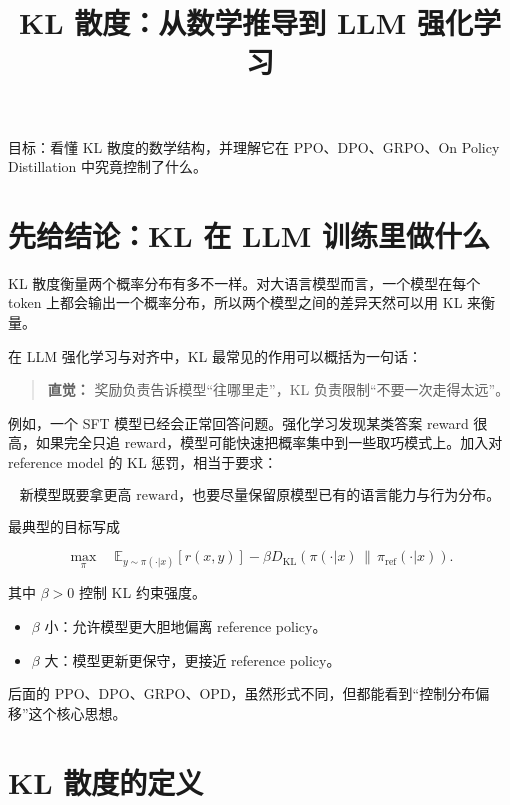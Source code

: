 \documentclass[11pt,a4paper]{ctexart}
\title{\textbf{KL 散度：从数学推导到 LLM 强化学习}}
\author{}
\date{}
\newcommand{\KL}[2]{D_{\mathrm{KL}}\!\left(#1\,\middle\|\,#2\right)}
\newcommand{\E}{\mathbb{E}}
\newcommand{\piref}{\pi_{\mathrm{ref}}}
\newenvironment{intuition}
{\begin{quote}\small\textbf{直觉：}}
{\end{quote}}
\begin{document}
\maketitle
\vspace{-2em}

\begin{center}
\small
目标：看懂 KL 散度的数学结构，并理解它在 PPO、DPO、GRPO、On Policy Distillation 中究竟控制了什么。
\end{center}

\tableofcontents

\section{先给结论：KL 在 LLM 训练里做什么}

KL 散度衡量两个概率分布有多不一样。对大语言模型而言，一个模型在每个 token 上都会输出一个概率分布，所以两个模型之间的差异天然可以用 KL 来衡量。

在 LLM 强化学习与对齐中，KL 最常见的作用可以概括为一句话：

\begin{intuition}
奖励负责告诉模型“往哪里走”，KL 负责限制“不要一次走得太远”。
\end{intuition}

例如，一个 SFT 模型已经会正常回答问题。强化学习发现某类答案 reward 很高，如果完全只追 reward，模型可能快速把概率集中到一些取巧模式上。加入对 reference model 的 KL 惩罚，相当于要求：

\[
\text{新模型既要拿更高 reward，也要尽量保留原模型已有的语言能力与行为分布。}
\]

最典型的目标写成

\begin{equation}
\max_{\pi}
\quad
\E_{y\sim\pi(\cdot|x)}[r(x,y)]
-
\beta \KL{\pi(\cdot|x)}{\piref(\cdot|x)}.
\label{eq:regularized_rl}
\end{equation}

其中 $\beta>0$ 控制 KL 约束强度。

\begin{itemize}
    \item $\beta$ 小：允许模型更大胆地偏离 reference policy。
    \item $\beta$ 大：模型更新更保守，更接近 reference policy。
\end{itemize}

后面的 PPO、DPO、GRPO、OPD，虽然形式不同，但都能看到“控制分布偏移”这个核心思想。

\section{KL 散度的定义}
\end{document}
